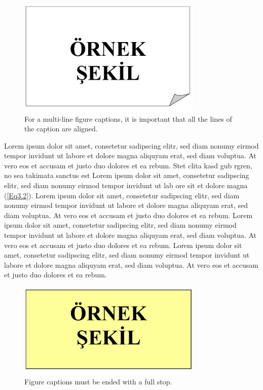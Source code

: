 \begin{figure}
	\centering
	\includegraphics[width=250pt,keepaspectratio=true]{./fig/sekil3}
	\caption{For a multi-line figure captions, it is important that all the lines of the caption are aligned.}
	\label{Figure3.2}
\end{figure}


Lorem ipsum dolor sit amet, consetetur sadipscing elitr, sed diam nonumy eirmod tempor invidunt ut labore et dolore magna aliquyam erat, sed diam voluptua. At vero eos et accusam et justo duo dolores et ea rebum. Stet clita kasd gub rgren, no sea takimata sanctus est Lorem ipsum dolor sit amet, consetetur sadipscing elitr, sed diam nonumy eirmod tempor invidunt ut lab ore sit et dolore magna (\ref{Eq3.2}). Lorem ipsum dolor sit amet, consetetur sadipscing elitr, sed diam nonumy eirmod tempor invidunt ut labore et dolore magna aliquyam erat, sed diam voluptua. At vero eos et accusam et justo duo dolores et ea rebum. Lorem ipsum dolor sit amet, consetetur sadipscing elitr, sed diam nonumy eirmod tempor invidunt ut labore et dolore magna aliquyam erat, sed diam voluptua. At vero eos et accusam et justo duo dolores et ea rebum. Lorem ipsum dolor sit amet, consetetur sadipscing elitr, sed diam nonumy eirmod tempor invidunt ut labore et dolore magna aliquyam erat, sed diam voluptua. At vero eos et accusam et justo duo dolores et ea rebum.

\begin{figure}
	\centering
	\includegraphics[width=250pt,keepaspectratio=true]{./fig/sekil4}
	\caption{Figure captions must be ended with a full stop.}
	\label{Figure3.4}
\end{figure}

